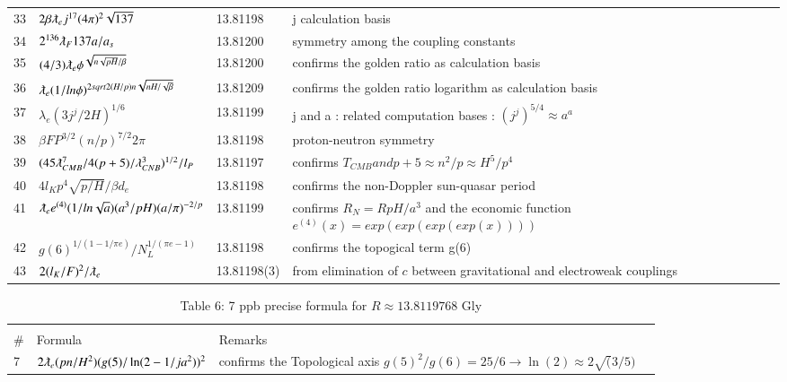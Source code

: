\documentclass[a4paper,9pt]{article}
\begin{document}
\begin{appendix}
\begin{table}
\begin{tabular}{llll}
  33 & $2\beta \lambdabar_{e} j^{17} (4\pi)^2 \sqrt{137}$ & 13.81198 & j calculation basis \\
  34 & $ 2^{136}\lambdabar_{F}137 a/a_s $ & 13.81200 & symmetry among the coupling constants \\
  35 & $ (4/3)\lambdabar_e \phi^{\sqrt {n\sqrt{pH}/\beta}} $ & 13.81200 & confirms the golden ratio as calculation basis \\
    36 & $ \lambdabar_e (1/ln\phi)^{2sqrt {2(H/p)n\sqrt{nH/\sqrt\beta}}} $ & 13.81209 & confirms the golden ratio logarithm as calculation basis \\
   37 & $\lambda_{e} (3j^j/2H)^{1/6}$ & 13.81199 & j and a : related computation bases : $(j^j)^{5/4} \approx a^a$\\
   38 & $\beta F P^{3/2} (n/p)^{7/2} 2 \pi$ & 13.81198 & proton-neutron symmetry  \\ 
   39 & $(45\lambdabar_{CMB}^7/4(p+5)/\lambda_{CNB}^3)^{1/2}/l_P$ & 13.81197 & confirms $T_{CMB} and p+5 \approx n^2/p \approx H^5/p^4$\\
   40 & $4l_Kp^4 \sqrt{p/H}/\beta d_e$ & 13.81198 & confirms the non-Doppler sun-quasar period \\
   41 & $\lambdabar_{e} e^{(4)}(1/ln{\sqrt a}) (a^3/pH) (a/\pi)^{-2/p}   $ & 13.81199 & confirms $R_N = R pH/a^3$ and the economic function $e^{(4)}(x)= exp(exp(exp(exp(x))))$\\
   42 & $g(6)^{1/(1-1/\pi e)}/N_L^{1/(\pi e-1)}$ & 13.81198 & confirms the topogical term g(6) \\ 
   43 & $2(l_K/F)^2/\lambdabar_{e}$ & 13.81198(3) & from elimination of $c$ between gravitational and electroweak couplings \\
  
  
    \bottomrule
  \end{tabular}
\end{table}

\begin{table}
\caption{Table 6: 7 ppb precise formula for $R \approx 13.8119768$ Gly}
\label{tab:6:table6}
  \hskip-2.0cm\begin{tabular}{llll}
    \toprule
    \multicolumn{3}{c}{}                   \\
    \cmidrule(r){1-3}
    \#     & Formula  & Remarks \\
    \midrule
    
    
   
    7 & $2\lambdabar_{e} (pn/H^{2})(g(5)/\ln(2-1/ja^2))^2$   & confirms the Topological axis $g(5)^2/g(6) = 25/6 \rightarrow \ln(2) \approx 2\sqrt(3/5)$  \\
    

\end{tabular}
\end{table}
\end{appendix}
\end{document}
